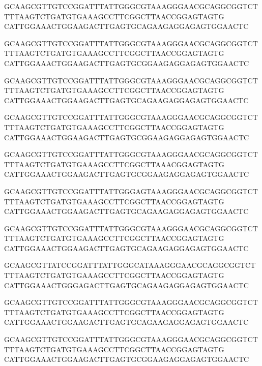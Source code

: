 GCAAGCGTTGTCCGGATTTATTGGGCGTAAAGGGAACGCAGGCGGTCTTTTAAGTCTGATGTGAAAGCCTTCGGCTTAACCGGAGTAGTG
\phantom{loremip}CATTGGAAACTGGAAGACTTGAGTGCAGAAGAGGAGAGTGGAACTC

%
GCAAGCGTTGTCCGGATTTATTGGGCGTAAAGGGAACGCAGGCGGTCTTTTAAGTCTGATGTGAAAGCCTTCGGCTTAACCGGAGTAGTG
\phantom{loremip}CATTGGAAACTGGAAGACTTGAGTGC\color{red}G\color{black}GAAGAGGAGAGTGGAACTC

GCAAGCGTTGTCCGGATTTATTGGGCGTAAAGGGAACGCAGGCGGTCTTTTAAGTCTGATGTGAAAGCCTTCGGCTTAACCGGAGTAGTG
\phantom{loremip}CATTGGAAACTGGAAGACTTGAGTGCAGAAGAGGAGAGTGGAACTC

GCAAGCGTTGTCCGGATTTATTGGGCGTAAAGGGAACGCAGGCGGTCTTTTAAGTCTGATGTGAAAGCCTTCGGCTTAACCGGAGTAGTG
\phantom{loremip}CATTGGAAACTGGAAGACTTGAGTGC\color{red}G\color{black}GAAGAGGAGAGTGGAACTC

GCAAGCGTTGTCCGGATTTATTGGGCGTAAAGGGAACGCAGGCGGTCTTTTAAGTCTGATGTGAAAGCCTTCGGCTTAA\color{red}A\color{black}CGGAGTAGTG
\phantom{loremip}CATTGGAAACTGGAAGACTTGAGTGC\color{red}G\color{black}GAAGAGGAGAGTGGAACTC

GCAAGCGTTGTCCGGATTTATTGGG\color{red}A\color{black}GTAAAGGGAACGCAGGCGGTCTTTTAAGTCTGATGTGAAAGCCTTCGGCTTAACCGGAGTAGTG
\phantom{loremip}CATTGGAAACTGGAAGACTTGAGTGCAGAAGAGGAGAGTGGAACTC

GCAAGCGTTGTCCGGATTTATTGGGCGTAAAGGGAACGCAGGCGGTCTTTTAAGTCTGATGTGAAAGCCTTCGGCTTAACCGGAGTAGTG
\phantom{loremip}CATTGGAAACTGGAAGACTTGAGTGCAGAAGAGGAGAGTGGAACTC

GCAAGCGTT\color{red}A\color{black}TCCGGATTTATTGGGC\color{red}A\color{black}TAAAGGGAACGCAGGCGGTCTTTTAAGTCTGATGTGAAAGCCTTCGGCTTAACCGGAGTAGTG
\phantom{loremip}CATTGGAAACTGG\color{red}G\color{black}AGACTTGAGTGCAGAAGAGGAGAGTGGAACTC

GCAAGCGTTGTCCGGATTTATTGGGCGTAAAGGGAACGCAGGCGGTCTTTTAAGTCTGATGTGAAAGCCTTCGGCTTAACCGGAGTAGTG
\phantom{loremip}CATTGGAAACTGGAAGACTTGAGTGCAGAAGAGGAGAGTGGAACTC

GCAAGCGTTGTCCGGATTTATTGGGCGTAAAGGGAACGCAGGCGGTCTTTTAAGTCTGATGTGAAAGCCTTCGGCTTAACCGGAGTAGTG
\phantom{loremip}CATTGGAAACTGGAAGACTTGAGTGC\color{red}G\color{black}GAAGAGGAGAGTGGAACTC